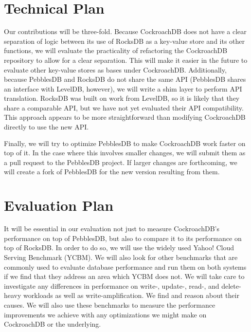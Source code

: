 \documentclass[10pt,twocolumn,letterpaper]{article}
\begin{document}

\section{Technical Plan}
Our contributions will be three-fold. Because CockroachDB does not have a clear separation of logic between its use of RocksDB as a key-value store and its other functions, we will evaluate the practicality of refactoring the CockroachDB repository to allow for a clear separation. This will make it easier in the future to evaluate other key-value stores as bases under CockroachDB. Additionally, because PebblesDB and RocksDB do not share the same API (PebblesDB shares an interface with LevelDB, however), we will write a shim layer to perform API translation. RocksDB was built on work from LevelDB, so it is likely that they share a comparable API, but we have not yet evaluated their API compatibility. This approach appears to be more straightforward than modifying CockroachDB directly to use the new API.\par
Finally, we will try to optimize PebblesDB to make CockroachDB work faster on top of it. In the case where this involves smaller changes, we will submit them as a pull request to the PebblesDB project. If larger changes are forthcoming, we will create a fork of PebblesDB for the new version resulting from them.


\section{Evaluation Plan}
It will be essential in our evaluation not just to measure CockroachDB's performance on top of PebblesDB, but also to compare it to its performance on top of RocksDB. In order to do so, we will use the widely used Yahoo! Cloud Serving Benchmark (YCBM). We will also look for other benchmarks that are commonly used to evaluate database performance and run them on both systems if we find that they address an area which YCBM does not. We will take care to investigate any differences in performance on write-, update-, read-, and delete-heavy workloads as well as write-amplification. We find and reason about their causes. We will also use these benchmarks to measure the performance improvements we achieve with any optimizations we might make on CockroachDB or the underlying.
\end{document}
